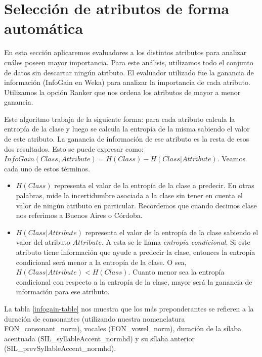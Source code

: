 
\section{Selección de atributos de forma automática}



En esta sección aplicaremos evaluadores a los distintos atributos para analizar cuáles poseen mayor importancia. Para este análisis, utilizamos todo el conjunto de datos sin descartar ningún atributo. El evaluador utilizado fue la ganancia de información (InfoGain en Weka) para analizar la importancia de cada atributo. Utilizamos la opción Ranker que nos ordena los atributos de mayor a menor ganancia.

Este algoritmo trabaja de la siguiente forma: para cada atributo calcula la entropía de la clase y luego se calcula la entropía de la misma sabiendo el valor de este atributo. La ganancia de información de ese atributo es la resta de esos dos resultados. Esto se puede expresar como: $InfoGain(Class,Attribute) = H(Class) - H(Class | Attribute)$. Veamos cada uno de estos términos.

\begin{itemize}
	\item $H(Class)$ representa el valor de la entropía de la clase a predecir. En otras palabras, mide la incertidumbre asociada a la clase sin tener en cuenta el valor de ningún atributo en particular. Recordemos que cuando decimos clase nos referimos a Buenos Aires o Córdoba.
	
	\item  $H(Class | Attribute)$ representa el valor de la entropía de la clase sabiendo el valor del atributo $Attribute$. A esta se le llama \textit{entropía condicional}. Si este atributo tiene información que ayude a predecir la clase, entonces la entropía condicional será menor a la entropía de la clase. O sea, $H(Class | Attribute) < H(Class)$. Cuanto menor sea la entropía condicional con respecto a la entropía de la clase, mayor será la ganancia de información para ese atributo.
\end{itemize}

La tabla \ref{infogain-table} nos muestra que los más preponderantes se refieren a la duración de consonantes (utilizando nuestra nomenclatura FON\_consonant\_norm), vocales (FON\_vowel\_norm), duración de la sílaba acentuada (SIL\_syllableAccent\_\-normhd) y su sílaba anterior \\ (SIL\_prevSyllableAccent\_normhd). 	 

